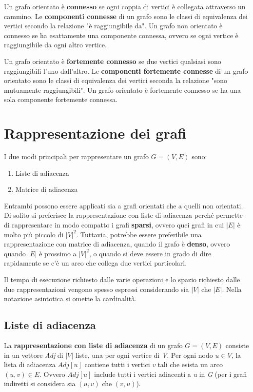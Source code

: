 \documentclass[10pt, a4paper]{report}
\begin{document}
Un grafo orientato è \textbf{connesso} se ogni coppia di vertici è collegata attraverso un cammino. Le \textbf{componenti connesse} di un grafo sono le classi di equivalenza dei vertici secondo la relazione "è raggiungibile da". Un grafo non orientato è connesso se ha esattamente una componente connessa, ovvero se ogni vertice è raggiungibile da ogni altro vertice.

Un grafo orientato è \textbf{fortemente connesso} se due vertici qualsiasi sono raggiungibili l'uno dall'altro. Le \textbf{componenti fortemente connesse} di un grafo orientato sono le classi di equivalenza dei vertici seconda la relazione "sono mutuamente raggiungibili". Un grafo orientato è fortemente connesso se ha una sola componente fortemente connessa.
\section{Rappresentazione dei grafi}
I due modi principali per rappresentare un grafo $G = (V,E)$ sono:
\begin{enumerate}
\item Liste di adiacenza
\item Matrice di adiacenza
\end{enumerate}
Entrambi possono essere applicati sia a grafi orientati che a quelli non orientati. Di solito si preferisce la rappresentazione con liste di adiacenza perché permette di rappresentare in modo compatto i grafi \textbf{sparsi}, ovvero quei grafi in cui $|E|$ è molto più piccolo di $|V|^2$.  Tuttavia, potrebbe essere preferibile una rappresentazione con matrice di adiacenza, quando il grafo è \textbf{denso}, ovvero quando $|E|$ è prossimo a $|V|^2$, o quando si deve essere in grado di dire rapidamente se c'è un arco che collega due vertici particolari.

Il tempo di esecuzione richiesto dalle varie operazioni e lo spazio richiesto dalle due rappresentazioni vengono spesso espressi considerando sia $|V|$ che $|E|$. Nella notazione asintotica si omette la cardinalità.
\subsection{Liste di adiacenza}
La \textbf{rappresentazione con liste di adiacenza} di un grafo $G = (V,E)$ consiste in un vettore \textit{Adj} di $|V|$ liste, una per ogni vertice di \textit{V}. Per ogni nodo $u \in V$, la lista di adiacenza $Adj[u]$ contiene tutti i vertici \textit{v} tali che esista un arco $(u,v) \in E$. Ovvero $Adj[u]$ include tutti i vertici adiacenti a \textit{u} in \textit{G} (per i grafi indiretti si considera sia $(u,v)$ che $(v,u)$).
\end{document}
